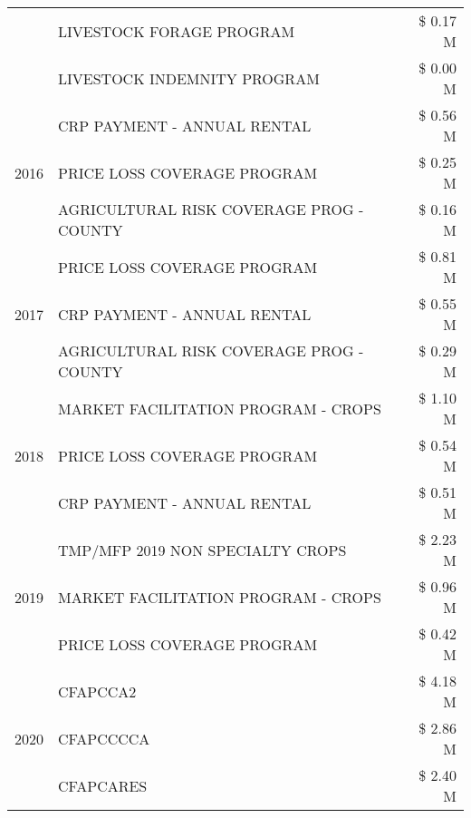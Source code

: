 \begin{tabular}{llr}
 & LIVESTOCK FORAGE PROGRAM & \$ 0.17 M \\
 & LIVESTOCK INDEMNITY PROGRAM & \$ 0.00 M \\
\cline{1-3}
\multirow[t]{3}{*}{2016} & CRP PAYMENT - ANNUAL RENTAL & \$ 0.56 M \\
 & PRICE LOSS COVERAGE PROGRAM & \$ 0.25 M \\
 & AGRICULTURAL RISK COVERAGE PROG - COUNTY & \$ 0.16 M \\
\cline{1-3}
\multirow[t]{3}{*}{2017} & PRICE LOSS COVERAGE PROGRAM & \$ 0.81 M \\
 & CRP PAYMENT - ANNUAL RENTAL & \$ 0.55 M \\
 & AGRICULTURAL RISK COVERAGE PROG - COUNTY & \$ 0.29 M \\
\cline{1-3}
\multirow[t]{3}{*}{2018} & MARKET FACILITATION PROGRAM - CROPS & \$ 1.10 M \\
 & PRICE LOSS COVERAGE PROGRAM & \$ 0.54 M \\
 & CRP PAYMENT - ANNUAL RENTAL & \$ 0.51 M \\
\cline{1-3}
\multirow[t]{3}{*}{2019} & TMP/MFP 2019 NON SPECIALTY CROPS & \$ 2.23 M \\
 & MARKET FACILITATION PROGRAM - CROPS & \$ 0.96 M \\
 & PRICE LOSS COVERAGE PROGRAM & \$ 0.42 M \\
\cline{1-3}
\multirow[t]{3}{*}{2020} & CFAPCCA2 & \$ 4.18 M \\
 & CFAPCCCCA & \$ 2.86 M \\
 & CFAPCARES & \$ 2.40 M \\
\cline{1-3}
\bottomrule
\end{tabular}
